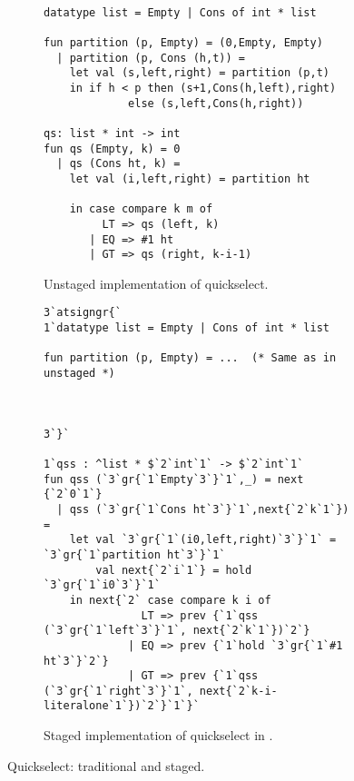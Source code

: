 
\begin{figure*}
\begin{subfigure}[t]{0.45\textwidth}
\begin{lstlisting} 

datatype list = Empty | Cons of int * list

fun partition (p, Empty) = (0,Empty, Empty) 
  | partition (p, Cons (h,t)) = 
    let val (s,left,right) = partition (p,t) 
    in if h < p then (s+1,Cons(h,left),right) 
             else (s,left,Cons(h,right))

qs: list * int -> int
fun qs (Empty, k) = 0
  | qs (Cons ht, k) =
    let val (i,left,right) = partition ht

    in case compare k m of
         LT => qs (left, k)
       | EQ => #1 ht
       | GT => qs (right, k-i-1)
\end{lstlisting}
\caption{Unstaged implementation of quickselect.}
\label{fig:qs-unstaged}
\end{subfigure}
\hfill
\begin{subfigure}[t]{0.55\textwidth}
\begin{lstlisting} 
3`atsigngr{`  
1`datatype list = Empty | Cons of int * list

fun partition (p, Empty) = ...  (* Same as in unstaged *)



3`}`

1`qss : ^list * $`2`int`1` -> $`2`int`1`
fun qss (`3`gr{`1`Empty`3`}`1`,_) = next {`2`0`1`}
  | qss (`3`gr{`1`Cons ht`3`}`1`,next{`2`k`1`}) = 
    let val `3`gr{`1`(i0,left,right)`3`}`1` = `3`gr{`1`partition ht`3`}`1`
        val next{`2`i`1`} = hold `3`gr{`1`i0`3`}`1`
    in next{`2` case compare k i of
               LT => prev {`1`qss (`3`gr{`1`left`3`}`1`, next{`2`k`1`})`2`}
             | EQ => prev {`1`hold `3`gr{`1`#1 ht`3`}`2`}
             | GT => prev {`1`qss (`3`gr{`1`right`3`}`1`, next{`2`k-i-literalone`1`})`2`}`1`}`
\end{lstlisting}
\caption{Staged implementation of quickselect in \lang.}

\label{fig:qs-staged}
\end{subfigure}
\caption{Quickselect: traditional and staged.}
\end{figure*}

